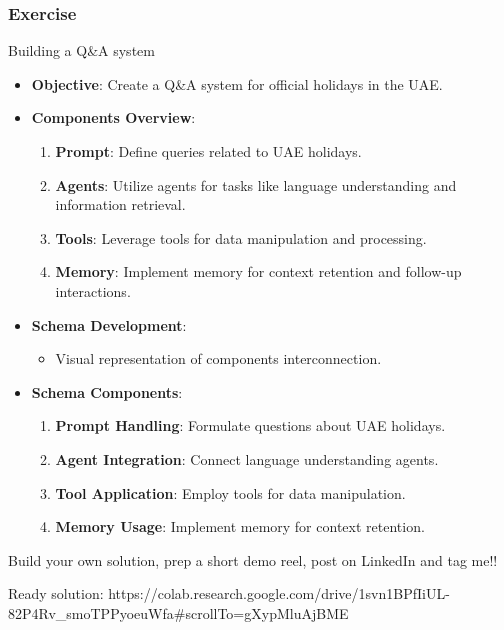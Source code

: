\begin{frame}[fragile]\frametitle{Exercise}

 Building a Q\&A system
 
  \begin{itemize}
    \item \textbf{Objective}: Create a Q\&A system for official holidays in the UAE.
    \item \textbf{Components Overview}:
      \begin{enumerate}
        \item \textbf{Prompt}: Define queries related to UAE holidays.
        \item \textbf{Agents}: Utilize agents for tasks like language understanding and information retrieval.
        \item \textbf{Tools}: Leverage tools for data manipulation and processing.
        \item \textbf{Memory}: Implement memory for context retention and follow-up interactions.
      \end{enumerate}
    \item \textbf{Schema Development}:
      \begin{itemize}
        \item Visual representation of components interconnection.
      \end{itemize}
    \item \textbf{Schema Components}:
      \begin{enumerate}
        \item \textbf{Prompt Handling}: Formulate questions about UAE holidays.
        \item \textbf{Agent Integration}: Connect language understanding agents.
        \item \textbf{Tool Application}: Employ tools for data manipulation.
        \item \textbf{Memory Usage}: Implement memory for context retention.
      \end{enumerate}
  \end{itemize}

Build your own solution, prep a short demo reel, post on LinkedIn and tag me!!

{\tiny Ready solution: https://colab.research.google.com/drive/1svn1BPfIiUL-82P4Rv\_smoTPPyoeuWfa\#scrollTo=gXypMluAjBME}
\end{frame}

